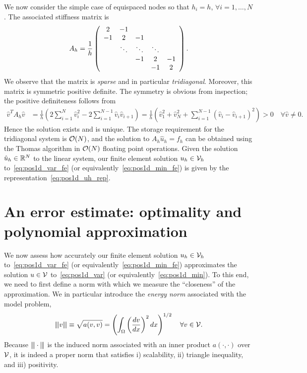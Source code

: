 We now consider the simple case of equispaced nodes so that $h_i = h$, $\forall i = 1,\dots,N$.  The associated stiffness matrix is
\begin{equation*}
  A_h = \frac{1}{h} \bmat{ccccc} 2 & -1 \\ -1 & 2 & -1 \\ & \ddots & \ddots & \ddots \\ & &-1 & 2 & -1 \\ &&& -1 & 2 \emat.
\end{equation*}
We observe that the matrix is \emph{sparse} and in particular \emph{tridiagonal}.  Moreover, this matrix is symmetric positive definite.  The symmetry is obvious from inspection; the positive definiteness follows from 
\begin{align*}
  \hat v^T A_h \hat v
  &=
  \frac{1}{h} \left(
  2\sum_{i=1}^N \hat v_i^2 - 2\sum_{i=1}^{N-1} \hat v_i\hat v_{i+1} 
  \right)
  =
  \frac{1}{h} \left(
  \hat v_1^2 + \hat v_{N}^2 + \sum_{i=1}^{N-1} (\hat v_i - \hat v_{i+1})^2 
  \right)
  > 0 \quad \forall \hat v \neq 0.
\end{align*}
Hence the solution exists and is unique.  The storage requirement for the tridiagonal system is $\calO(N)$, and the solution to $A_h \hat u_h = f_h$ can be obtained using the Thomas algorithm in $\calO(N)$ floating point operations.  Given the solution  $\hat u_h \in \RR^N$ to the linear system, our finite element solution $u_h \in \calV_h$ to~\eqref{eq:pos1d_var_fe} (or equivalently~\eqref{eq:pos1d_min_fe}) is given by the representation~\eqref{eq:pos1d_uh_rep}.

\section{An error estimate: optimality and polynomial approximation}
We now assess how accurately our finite element solution $u_h \in \calV_h$ to~\eqref{eq:pos1d_var_fe} (or equivalently~\eqref{eq:pos1d_min_fe}) approximates the solution $u \in \calV$ to~\eqref{eq:pos1d_var} (or equivalently~\eqref{eq:pos1d_min}).  To this end, we need to first define a norm with which we measure the ``closeness'' of the approximation. We in particular introduce the \emph{energy norm} associated with the model problem,
\begin{equation*}
  \enorm{v} \equiv \sqrt{a(v,v)}  = \left( \int_{\Omega} \left( \dd{v}{x} \right)^2 dx \right)^{1/2} \quad \forall v \in \calV.
\end{equation*}
Because $\enorm{ \cdot }$ is the induced norm associated with an inner product $a(\cdot,\cdot)$ over $\calV$, it is indeed a proper norm that satisfies i) scalability, ii) triangle inequality, and iii) positivity.  

